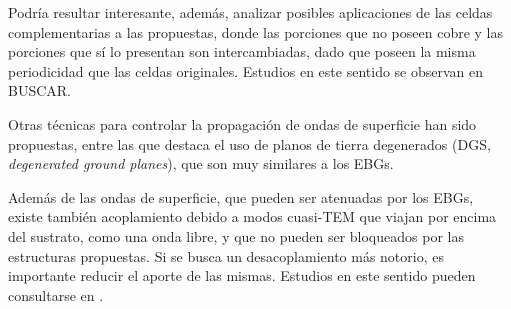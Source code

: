 Podría resultar interesante, además, analizar posibles aplicaciones de las celdas complementarias a las propuestas, donde las porciones que no poseen cobre y las porciones que sí lo presentan son intercambiadas, dado que poseen la misma periodicidad que las celdas originales. Estudios en este sentido se observan en BUSCAR.

Otras técnicas para controlar la propagación de ondas de superficie han sido propuestas, entre las que destaca el uso de planos de tierra degenerados (DGS, \textit{degenerated ground planes}), que son muy similares a los EBGs.

Además de las ondas de superficie, que pueden ser atenuadas por los EBGs, existe también acoplamiento debido a modos cuasi-TEM que viajan por encima del sustrato, como una onda libre, y que no pueden ser bloqueados por las estructuras propuestas. Si se busca un desacoplamiento más notorio, es importante reducir el aporte de las mismas. Estudios en este sentido pueden consultarse en \cite{Asimonis:designoptimization}.


